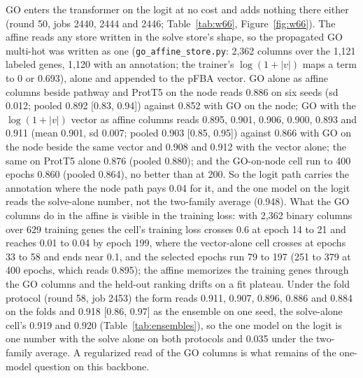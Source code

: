 GO enters the transformer on the logit at no cost and adds nothing there either
(round 50, jobs 2440, 2444 and 2446; Table~\ref{tab:w66}, Figure~\ref{fig:w66}). The
affine reads any store written in the solve store's shape, so the propagated GO
multi-hot was written as one (\texttt{go\_affine\_store.py}: 2,362 columns over the
1,121 labeled genes, 1,120 with an annotation; the trainer's $\log(1 + |v|)$ maps a
term to 0 or 0.693), alone and appended to the pFBA vector. GO alone as affine
columns beside pathway and ProtT5 on the node reads 0.886 on six seeds (sd 0.012;
pooled 0.892 [0.83, 0.94]) against 0.852 with GO on the node; GO with the
$\log(1 + |v|)$ vector as affine columns reads 0.895, 0.901, 0.906, 0.900, 0.893 and
0.911 (mean 0.901, sd 0.007; pooled 0.903 [0.85, 0.95]) against 0.866 with GO on the
node beside the same vector and 0.908 and 0.912 with the vector alone; the same on
ProtT5 alone 0.876 (pooled 0.880); and the GO-on-node cell run to 400 epochs 0.860
(pooled 0.864), no better than at 200. So the logit path carries the annotation
where the node path pays 0.04 for it, and the one model on the logit reads the
solve-alone number, not the two-family average (0.948). What the GO columns do in
the affine is visible in the training loss: with 2,362 binary columns over 629
training genes the cell's training loss crosses 0.6 at epoch 14 to 21 and reaches
0.01 to 0.04 by epoch 199, where the vector-alone cell crosses at epochs 33 to 58 and
ends near 0.1, and the selected epochs run 79 to 197 (251 to 379 at 400 epochs, which
reads 0.895); the affine memorizes the training genes through the GO columns and the
held-out ranking drifts on a fit plateau. Under the fold protocol (round 58, job
2453) the form reads 0.911, 0.907, 0.896, 0.886 and 0.884 on the folds and 0.918
[0.86, 0.97] as the ensemble on one seed, the solve-alone cell's 0.919 and 0.920
(Table~\ref{tab:ensembles}), so the one model on the logit is one number with the
solve alone on both protocols and 0.035 under the two-family average. A regularized
read of the GO columns is what remains of the one-model question on this backbone.




